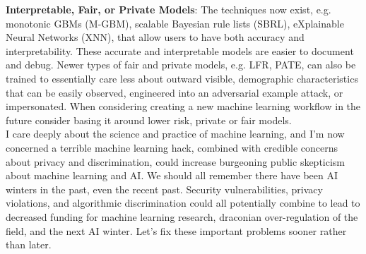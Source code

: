 \documentclass[fleqn]{article}
\begin{document}
\noindent\textbf{Interpretable, Fair, or Private Models}: The techniques now exist, e.g. monotonic GBMs (M-GBM), scalable Bayesian rule lists (SBRL), eXplainable Neural Networks (XNN), that allow users to have both accuracy and interpretability. These accurate and interpretable models are easier to document and debug. Newer types of fair and private models, e.g. LFR, PATE, can also be trained to essentially care less about outward visible, demographic characteristics that can be easily observed, engineered into an adversarial example attack, or impersonated. When considering creating a new machine learning workflow in the future consider basing it around lower risk, private or fair models.\\

I care deeply about the science and practice of machine learning, and I'm now concerned a terrible machine learning hack, combined with credible concerns about privacy and discrimination, could increase burgeoning public skepticism about machine learning and AI. We should all remember there have been AI winters in the past, even the recent past. Security vulnerabilities, privacy violations, and algorithmic discrimination could all potentially combine to lead to decreased funding for machine learning research, draconian over-regulation of the field, and the next AI winter. Let's fix these important problems sooner rather than later.
\end{document}
